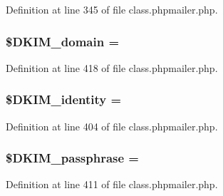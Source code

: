 Definition at line 345 of file class.\+phpmailer.\+php.

\subsubsection[{\texorpdfstring{\$\+D\+K\+I\+M\+\_\+domain}{$DKIM_domain}}]{\setlength{\rightskip}{0pt plus 5cm}\$D\+K\+I\+M\+\_\+domain = \textquotesingle{}\textquotesingle{}}\hypertarget{class_p_h_p_mailer_a1e49cdb6cd38fc496bd5a93092cac0e7}{}\label{class_p_h_p_mailer_a1e49cdb6cd38fc496bd5a93092cac0e7}


Definition at line 418 of file class.\+phpmailer.\+php.

\subsubsection[{\texorpdfstring{\$\+D\+K\+I\+M\+\_\+identity}{$DKIM_identity}}]{\setlength{\rightskip}{0pt plus 5cm}\$D\+K\+I\+M\+\_\+identity = \textquotesingle{}\textquotesingle{}}\hypertarget{class_p_h_p_mailer_a677f605bf9bb29be802c5d17d8a0a22c}{}\label{class_p_h_p_mailer_a677f605bf9bb29be802c5d17d8a0a22c}


Definition at line 404 of file class.\+phpmailer.\+php.

\subsubsection[{\texorpdfstring{\$\+D\+K\+I\+M\+\_\+passphrase}{$DKIM_passphrase}}]{\setlength{\rightskip}{0pt plus 5cm}\$D\+K\+I\+M\+\_\+passphrase = \textquotesingle{}\textquotesingle{}}\hypertarget{class_p_h_p_mailer_a4f94813eecc8b5ebf32284d9a966f594}{}\label{class_p_h_p_mailer_a4f94813eecc8b5ebf32284d9a966f594}


Definition at line 411 of file class.\+phpmailer.\+php.

